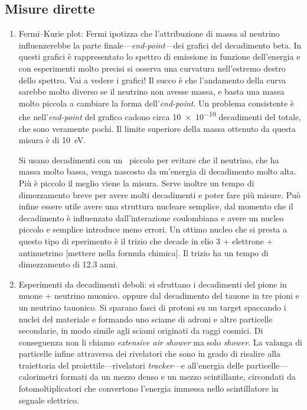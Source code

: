         \subsection{Misure dirette}
            \begin{enumerate}
                \item Fermi--Kurie plot: Fermi ipotizza che l'attribuzione di massa al neutrino influenzerebbe la parte finale---\emph{end-point}---dei grafici del decadimento beta. In questi grafici è rappresentato lo spettro di emissione in funzione dell'energia e con esperimenti molto precisi si osserva una curvatura nell'estremo destro dello spettro. Vai a vedere i grafici! Il succo è che l'andamento della curva sarebbe molto diverso se il neutrino non avesse massa, e basta una massa molto piccola a cambiare la forma dell'\emph{end-point}. Un problema consistente è che nell'\emph{end-point} del grafico cadono circa \num{10e-10} decadimenti del totale, che sono veramente pochi. Il limite superiore della massa ottenuto da questa misura è di \SI{10}{\eV}.
                
                Si usano decadimenti con un \Qv\ piccolo per evitare che il neutrino, che ha massa molto bassa, venga nascosto da un'energia di decadimento molto alta. Più è piccolo il \Qv meglio viene la misura. Serve inoltre un tempo di dimezzamento breve per avere molti decadimenti e poter fare più misure. Può infine essere utile avere una struttura nucleare semplice, dal momento che il decadimento è influenzato dall'interazione coulombiana e avere un nucleo piccolo e semplice introduce meno errori. Un ottimo nucleo che si presta a questo tipo di eperimento è il trizio che decade in elio 3 + elettrone + antinuetrino [mettere nella formula chimica]. Il trizio ha un tempo di dimezzamento di 12.3 anni.

                \item Esperimenti da decadimenti deboli: si sfruttano i decadimenti del pione in muone + neutrino muonico. oppure dal decadimento del tauone in tre pioni e un neutrino tauonico. Si sparano fasci di protoni su un target spaccando i nuclei del materiale e formando uno sciame di adroni e altre particelle secondarie, in modo simile agli sciami originati da raggi cosmici. Di conseguenza non li chiamo \emph{extensive air shower} ma solo \emph{shower}. La valanga di particelle infine attraversa dei rivelatori che sono in grado di risalire alla traiettoria del proiettile---rivelatori \emph{tracker}---e all'energia delle particelle---calorimetri formati da un mezzo denso e un mezzo scintillante, circondati da fotomoltiplicatori che convertono l'energia immessa nello scintillatore in segnale elettrico.
                

\end{enumerate}
